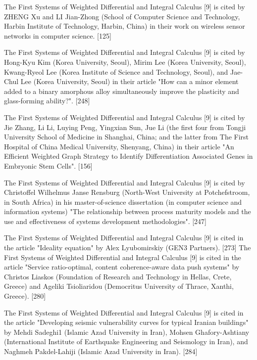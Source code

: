 \documentclass[12pt]{article}
\begin{document}
The First Systems of Weighted Differential and Integral Calculus [9] is cited by ZHENG Xu and LI Jian-Zhong (School of Computer Science and Technology, Harbin Institute of Technology, Harbin, China) in their work on wireless sensor networks in computer science. [125] 

The First Systems of Weighted Differential and Integral Calculus [9] is cited by Hong-Kyu Kim (Korea University, Seoul), Mirim Lee (Korea University, Seoul), Kwang-Ryeol Lee (Korea Institute of Science and Technology, Seoul), and Jae-Chul Lee (Korea University, Seoul) in their article "How can a minor element added to a binary amorphous alloy simultaneously improve the plasticity and glass-forming ability?". [248]    

The First Systems of Weighted Differential and Integral Calculus [9] is cited by Jie Zhang, Li Li, Luying Peng, Yingxian Sun, Jue Li (the first four from Tongji University School of Medicine in Shanghai, China; and the latter from The First Hospital of China Medical University, Shenyang, China) in their article "An Efficient Weighted Graph Strategy to Identify Differentiation Associated Genes in Embryonic Stem Cells". [156]  

The First Systems of Weighted Differential and Integral Calculus [9] is cited by Christoffel Wilhelmus Janse Rensburg (North-West University at Potchefstroom, in South Africa) in his master-of-science dissertation (in computer science and information systems) "The relationship between process maturity models and the use and effectiveness of systems development methodologies". [247]

The First Systems of Weighted Differential and Integral Calculus [9] is cited in the article "Ideality equation" by Alex Lyubomirskiy (GEN3 Partners). [273] 
The First Systems of Weighted Differential and Integral Calculus [9] is cited in the article "Service ratio-optimal, content coherence-aware data push systems" by Christos Liaskos (Foundation of Research and Technology in Hellas, Crete, Greece) and Ageliki Tsioliaridou (Democritus University of Thrace, Xanthi, Greece). [280]

The First Systems of Weighted Differential and Integral Calculus [9] is cited in the article "Developing seismic vulnerability curves for typical Iranian buildings" by Mehdi Sadeghi1 (Islamic Azad University in Iran), Mohsen Ghafory-Ashtiany (International Institute of Earthquake Engineering and Seismology in Iran), and Naghmeh Pakdel-Lahiji (Islamic Azad University in Iran). [284]
\end{document}
